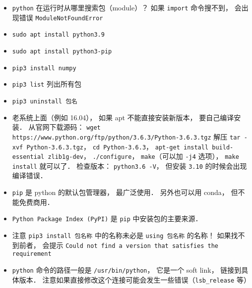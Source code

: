 

\begin{itemize}
\item \verb|python| 在运行时从哪里搜索包（module）？ 如果 \verb|import| 命令搜不到， 会出现错误 \verb|ModuleNotFoundError|
\item \verb|sudo apt install python3.9|
\item \verb|sudo apt install python3-pip|
\item \verb|pip3 install numpy|
\item \verb|pip3 list| 列出所有包
\item \verb|pip3 uninstall 包名|
\item 老系统上面（例如 16.04）， 如果 apt 不能直接安装新版本， 要自己编译安装． 从官网下载源码： \verb|wget https://www.python.org/ftp/python/3.6.3/Python-3.6.3.tgz| 解压 \verb|tar -xvf Python-3.6.3.tgz|， \verb|cd Python-3.6.3|， \verb|apt-get install build-essential zlib1g-dev|， \verb|./configure|， \verb|make|（可以加 \verb|-j4| 选项）， \verb|make install| 就可以了． 检查版本： \verb|python3.6 -V|， 但安装 \verb|3.10| 的时候会出现编译错误．
\item \verb|pip| 是 python 的默认包管理器， 最广泛使用． 另外也可以用 conda， 但不能免费商用．
\item \verb|Python Package Index (PyPI)| 是 \verb|pip| 中安装包的主要来源．
\item 注意 \verb|pip3 install 包名称| 中的名称未必是 \verb|using 包名称| 的名称！ 如果找不到前者， 会提示 \verb|Could not find a version that satisfies the requirement|
\item \verb|python| 命令的路径一般是 \verb|/usr/bin/python|， 它是一个 soft link， 链接到具体版本． 注意如果直接修改这个连接可能会发生一些错误（\verb|lsb_release| 等）
\end{itemize}
